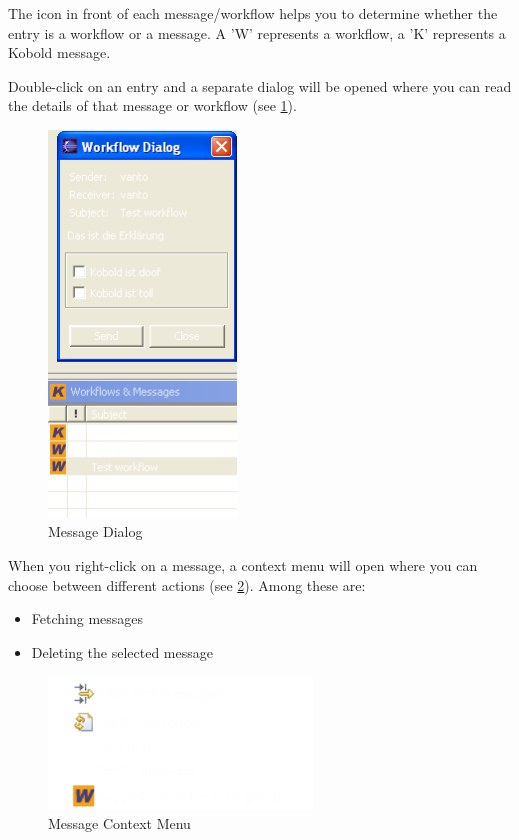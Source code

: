 The icon in front of each message/workflow helps you to determine whether the entry is a 
workflow or a message. A 'W' represents a workflow, a 'K' represents a Kobold message.\par

Double-click on an entry and a 
separate dialog will be opened where you can read the details of that message or
workflow (see \ref{workflowdialog}).

\begin{figure}[h!]
\begin{center}
\includegraphics[width=5cm]{workflowdialog.png}
   \caption{Message Dialog}
\label{workflowdialog}
\end{center}
\end{figure}\par

When you right-click on a message, a context menu will open where you can choose 
between different actions (see \ref{workflowkontext}). Among these are:

\begin{itemize}
	\item Fetching messages
	\item Deleting the selected message
\end{itemize}

\begin{figure}[h!]
\begin{center}
\includegraphics[width=7cm]{workflowkontext.png}
   \caption{Message Context Menu}
\label{workflowkontext}
\end{center}
\end{figure}\par

